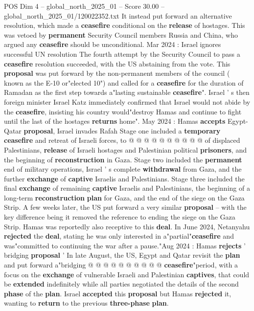 \begin{textsample}{POS Dim 4 – global\_north\_2025\_01 – Score 30.00 – global\_north\_2025\_01/120022352.txt}
It instead put forward an alternative resolution, which made a \textbf{ceasefire} conditional on the \textbf{release} of hostages.
This was vetoed by \textbf{permanent} Security Council members Russia and China, who argued any \textbf{ceasefire} should be unconditional.
Mar 2024 : Israel ignores successful UN resolution The fourth attempt by the Security Council to pass a \textbf{ceasefire} resolution succeeded, with the US abstaining from the vote.
This \textbf{proposal} was put forward by the non-permanent members of the council ( known as the E-10 or"elected 10") and called for a \textbf{ceasefire} for the duration of Ramadan as the first step towards a"lasting sustainable \textbf{ceasefire}".
Israel ' s then foreign minister Israel Katz immediately confirmed that Israel would not abide by the \textbf{ceasefire}, insisting his country would"destroy Hamas and continue to fight until the last of the hostages \textbf{returns} home".
May 2024 : Hamas \textbf{accepts} Egypt-Qatar \textbf{proposal}, Israel invades Rafah Stage one included a \textbf{temporary} \textbf{ceasefire} and retreat of Israeli forces, to @ @ @ @ @ @ @ @ @ @ of displaced Palestinians, \textbf{release} of Israeli hostages and Palestinian political \textbf{prisoners}, and the beginning of \textbf{reconstruction} in Gaza.
Stage two included the \textbf{permanent} end of military operations, Israel ' s complete \textbf{withdrawal} from Gaza, and the further \textbf{exchange} of \textbf{captive} Israelis and Palestinians.
Stage three included the final \textbf{exchange} of remaining \textbf{captive} Israelis and Palestinians, the beginning of a long-term \textbf{reconstruction} \textbf{plan} for Gaza, and the end of the siege on the Gaza Strip.
A few weeks later, the US put forward a very similar \textbf{proposal} -- with the key difference being it removed the reference to ending the siege on the Gaza Strip.
Hamas was reportedly also receptive to this \textbf{deal}.
In June 2024, Netanyahu \textbf{rejected} the \textbf{deal}, stating he was only interested in a"partial"\textbf{ceasefire} and was"committed to continuing the war after a pause."Aug 2024 : Hamas \textbf{rejects} ' bridging \textbf{proposal} ' In late August, the US, Egypt and Qatar revisit the \textbf{plan} and put forward a"bridging @ @ @ @ @ @ @ @ @ @ \textbf{ceasefire}"period, with a focus on the \textbf{exchange} of vulnerable Israeli and Palestinian \textbf{captives}, that could be \textbf{extended} indefinitely while all parties negotiated the details of the second \textbf{phase} of the \textbf{plan}.
Israel \textbf{accepted} this \textbf{proposal} but Hamas \textbf{rejected} it, wanting to \textbf{return} to the previous \textbf{three-phase} \textbf{plan}.

\end{textsample}
